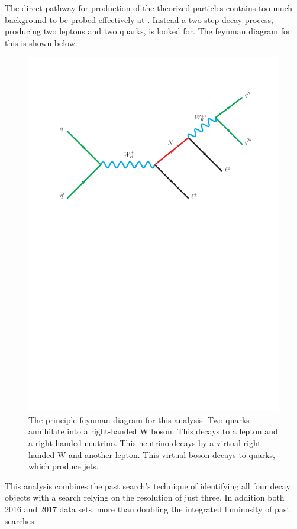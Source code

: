 The direct pathway for production of the theorized particles contains too much background to be probed effectively at \CMS.  Instead a two step decay process, producing two leptons and two quarks, is looked for.  The feynman diagram for this is shown below.
\begin{figure}[!htbp]
    \centering
    \includegraphics[width=\textwidth]{figures/feynman.pdf}
    \caption[
        The decay process searched for.
    ]{
      The principle feynman diagram for this analysis.  Two quarks annihilate into a right-handed W boson.  This decays to a lepton and a right-handed neutrino.  This neutrino decays by a virtual right-handed W and another lepton.  This virtual boson decays to quarks, which produce jets.
    }
    \label{fig:mainDiag}
\end{figure}
This analysis combines the past search's technique of identifying all four decay objects with a search relying on the resolution of just three. In addition both 2016 and 2017 data sets, more than doubling the integrated luminosity of past searches.

